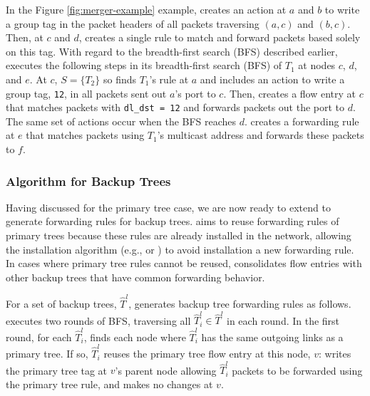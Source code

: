 In the Figure \ref{fig:merger-example} example, \merge  creates an action at $a$ and $b$ to write a group tag in the packet headers of all packets traversing $(a,c)$ and $(b,c)$.
Then, at $c$ and $d$, \merge creates a single rule to match and forward packets based solely on this tag.  With regard to the breadth-first search (BFS) described earlier, 
\merge executes the following steps in  its breadth-first search (BFS) of $T_1$ at nodes $c$, $d$, and $e$.
At $c$, $S=\{T_2\}$ so \merge finds $T_1$'s rule at $a$ and includes an action to write a group tag, {\tt 12}, in all packets sent out $a$'s port to $c$. 
Then, \merge creates a flow entry at $c$ that matches packets with {\tt dl\_dst = 12} and forwards packets out the port to $d$.  The same set of actions occur when the BFS reaches $d$. 
\merge creates a forwarding rule at $e$ that matches packets using $T_1$'s multicast address and forwards these packets to $f$.



\subsubsection{\mergen Algorithm for Backup Trees}
\label{subsubsec:merge-backup}

Having discussed \merge for the primary tree case, we are now ready to extend \merge to generate forwarding rules for backup trees.  \merge 
aims to reuse forwarding rules of primary trees because these rules are already installed in the network, allowing the installation algorithm
(e.g., \pre or \posts) to avoid installation a new forwarding rule.  In cases where primary tree rules cannot be reused, \merge consolidates
flow entries with other backup trees that have common forwarding behavior.

For a set of backup trees, $\hat{T}^l$, \merge generates backup tree forwarding rules as follows. 
\merge executes two rounds of BFS, traversing all
$\hat{T}^l_i \in \hat{T}^l$ in each round.  In the first round, for each $\hat{T}_i^l$, \merge finds each node where $\hat{T}_i^l$ has the same outgoing links as a primary tree.  
If so, $\hat{T}_i^l$ reuses the primary tree flow entry at this node, $v$: \merge writes the primary tree tag at $v$'s parent node
allowing $\hat{T}_i^l$ packets to be forwarded using the primary tree rule, and makes no changes at $v$.

